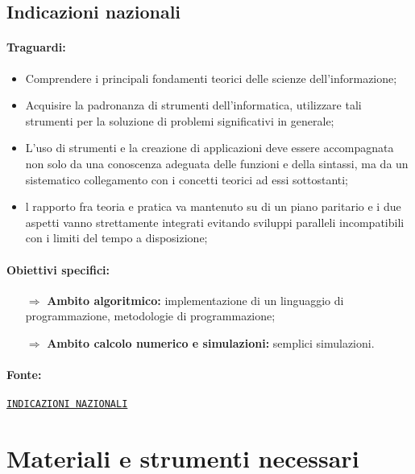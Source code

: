 \subsection{Indicazioni nazionali}

\paragraph{Traguardi:}

\begin{itemize}
    \item Comprendere i principali
    fondamenti teorici delle scienze dell’informazione;
    \item Acquisire la padronanza di strumenti
    dell’informatica, utilizzare tali strumenti per la soluzione di problemi significativi in generale;
    \item L'uso di strumenti e la creazione di applicazioni deve essere accompagnata non solo da una
    conoscenza adeguata delle funzioni e della sintassi, ma da un sistematico collegamento con i
    concetti teorici ad essi sottostanti;
    \item l rapporto fra teoria e pratica va mantenuto
    su di un piano paritario e i due aspetti vanno strettamente integrati evitando sviluppi paralleli
    incompatibili con i limiti del tempo a disposizione;
\end{itemize}

\paragraph{Obiettivi specifici:}

\begin{itemize}
    \item [$\Rightarrow$] \textbf{Ambito algoritmico:}  implementazione di un linguaggio di programmazione, metodologie di programmazione;
    \item [$\Rightarrow$] \textbf{Ambito calcolo numerico e simulazioni:} semplici simulazioni.
\end{itemize}

\paragraph{Fonte:} \href{https://www.istruzione.it/alternanza/allegati/NORMATIVA%20ASL/INDICAZIONI%20NAZIONALI%20PER%20I%20LICEI.pdf}{\texttt{INDICAZIONI NAZIONALI}}

\section{Materiali e strumenti necessari}


